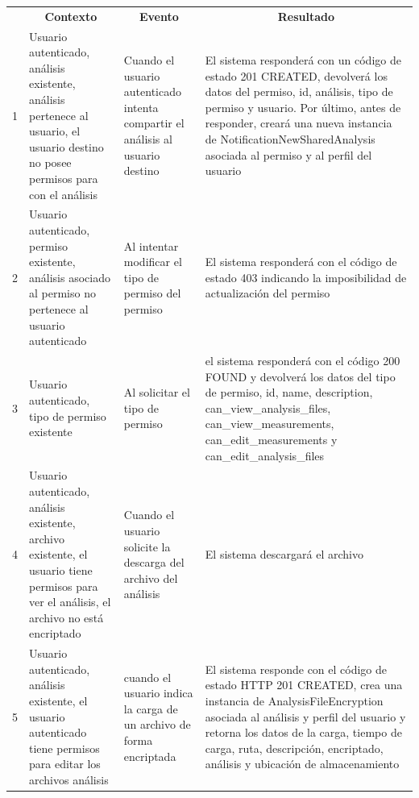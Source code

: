 \begin{center}
\begin{longtable}{|p{0.7cm}|p{4cm}|p{4cm}|p{5cm}| }

	\hline 
		\rowcolor[gray]{0.9} 
		\multicolumn{4}{|c|}{\textbf{Criterio de aceptación}} \\
	\hline
    	\rowcolor[gray]{0.9} 
    	\multicolumn{1}{|c}{\textbf{Id}} & \multicolumn{1}{|c}{\textbf{Contexto}} &  \multicolumn{1}{|c}{\textbf{Evento}} & \multicolumn{1}{|c|}{\textbf{Resultado}} \\
    \hline
    	
1&Usuario autenticado, análisis existente, análisis pertenece al usuario, el usuario destino no posee permisos para con el análisis & Cuando el usuario autenticado intenta compartir el análisis al usuario destino & El sistema responderá con un código de estado 201 CREATED, devolverá los datos del permiso, id, análisis, tipo de permiso y usuario. Por último, antes de responder, creará una nueva instancia de NotificationNewSharedAnalysis asociada al permiso y al perfil del usuario\\  \hline
 
2& Usuario autenticado, permiso existente, análisis asociado al permiso no pertenece al usuario autenticado   & Al intentar modificar el tipo de permiso del permiso & El sistema responderá con el código de estado 403 indicando la imposibilidad de actualización del permiso\\ \hline

3& Usuario autenticado, tipo de permiso existente & Al solicitar el tipo de permiso & el sistema responderá con el código 200 FOUND y devolverá los datos del tipo de permiso, id, name, description, can\_view\_analysis\_files, can\_view\_measurements, can\_edit\_measurements y can\_edit\_analysis\_files\\ \hline

4& Usuario autenticado, análisis existente, archivo existente, el usuario tiene permisos para ver el análisis, el archivo no está encriptado & Cuando el usuario solicite la descarga del archivo del análisis & El sistema descargará el archivo\\ \hline

5& Usuario autenticado, análisis existente, el usuario autenticado tiene permisos para editar los archivos análisis & cuando el usuario indica la carga de un archivo de forma encriptada & El sistema responde con el código de estado HTTP 201 CREATED, crea una instancia de AnalysisFileEncryption asociada al análisis y perfil del usuario y retorna los datos de la carga, tiempo de carga, ruta, descripción, encriptado, análisis y ubicación de almacenamiento\\ \hline


\end{longtable}
\end{center}
